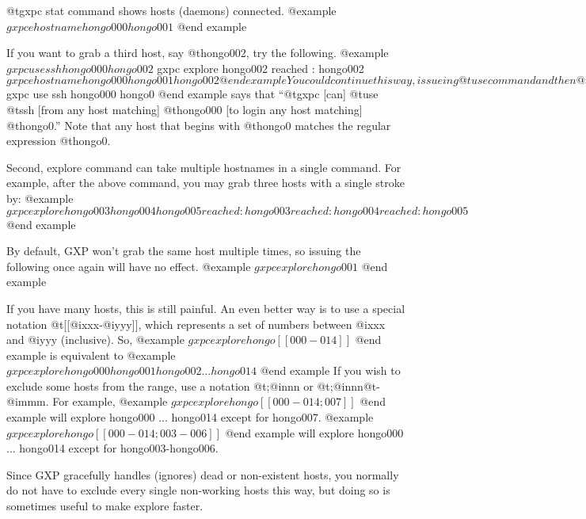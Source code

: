 @t{gxpc stat} command shows hosts (daemons) connected.
@example
$ gxpc e hostname
hongo000
hongo001
$
@end example


If you want to grab a third host, say @t{hongo002}, try the following.
@example
$ gxpc use ssh hongo000 hongo002
$ gxpc explore hongo002
reached : hongo002
$ gxpc e hostname
hongo000
hongo001
hongo002
@end example

You could continue this way, issueing @t{use} command and then @t{explore}
command to get a single host at a time, but this is obviously not so
comfortable if you have hundred hosts, say @t{hongo000} -- @t{hongo099}.
The first trick to learn is that, both the second and the third
arguments to @t{use} command are actually @i{regular expressions} of
hostnames. Therefore, the following single line:
@example
$ gxpc use ssh hongo000 hongo0
@end example
says that ``@t{gxpc} [can] @t{use} @t{ssh} [from any host matching]
@t{hongo000} [to login any host matching] @t{hongo0}.''  Note that any
host that begins with @t{hongo0} matches the regular expression
@t{hongo0}.

Second, explore command can take multiple hostnames in a single
command. For example, after the above command, you may grab three 
hosts with a single stroke by:
@example
$ gxpc explore hongo003 hongo004 hongo005
reached : hongo003
reached : hongo004
reached : hongo005
$
@end example

By default, GXP won't grab the same host multiple times, so issuing
the following once again will have no effect.
@example
$ gxpc explore hongo001
$
@end example

If you have many hosts, this is still painful. An even better way
is to use a special notation @t{[[@i{xxx}-@i{yyy}]]}, which represents
a set of numbers between @i{xxx} and @i{yyy} (inclusive). So, 
@example
$ gxpc explore hongo[[000-014]]
$
@end example
is equivalent to 
@example
$ gxpc explore hongo000 hongo001 hongo002 ... hongo014
$
@end example
If you wish to exclude some hosts from the range, use a notation
@t{;}@i{nnn} or @t{;}@i{nnn}@t{-}@i{mmm}. For example,
@example
$ gxpc explore hongo[[000-014;007]]
$
@end example
will explore hongo000 ... hongo014 except for hongo007.
@example
$ gxpc explore hongo[[000-014;003-006]]
$
@end example
will explore hongo000 ... hongo014 except for hongo003-hongo006.

Since GXP gracefully handles (ignores) dead or non-existent hosts, you
normally do not have to exclude every single non-working hosts this
way, but doing so is sometimes useful to make explore faster.

